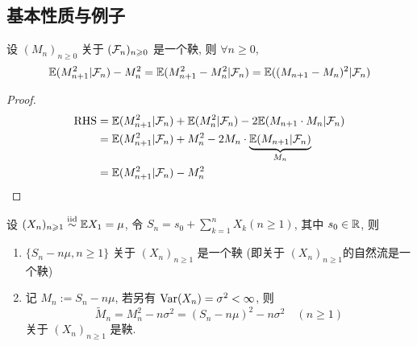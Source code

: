 \subsection{基本性质与例子}

\begin{property}\label{prt:p142-prt1}
设 $(M_n)_{n\geq 0}$ 关于 $(\mathcal{F}_n)_{n\geqslant 0}$ 是一个鞅, 则 $\forall n\geq 0$,
\[
\mathbb E(M_{n+1}^2|\mathcal{F}_n)-M_n^2=\mathbb E(M_{n+1}^2-M_n^2|\mathcal{F}_n)=\mathbb E((M_{n+1}-M_n)^2|\mathcal{F}_n)
\]
\end{property}

\begin{proof}
    \[
    \begin{aligned}
        \operatorname{RHS} &= \mathbb E(M_{n+1}^2|\mathcal{F}_n)+\mathbb E(M_n^2|\mathcal{F}_n)-2\mathbb E(M_{n+1}\cdot M_n|\mathcal{F}_n)\\
        &=\mathbb E(M_{n+1}^2|\mathcal{F}_n)+M_n^2-2M_n\cdot \underbrace{\mathbb E(M_{n+1}|\mathcal{F}_n)}_{M_n}\\
        &=\mathbb E(M_{n+1}^2|\mathcal{F}_n)-M_n^2
    \end{aligned}
    \]
\end{proof}

\begin{example}
    设 $(X_n)_{n\geqslant 1}\overset{\text{iid}}{\sim}\mathbb E X_1=\mu$, 令 $S_n=s_0+\sum_{k=1}^n X_k(n\geq 1)$, 其中 $s_0\in \mathbb{R}$, 则
    \begin{enumerate}
        \item $\{S_n-n\mu,n\geq 1\}$ 关于 $(X_n)_{n\geq 1}$ 是一个鞅 (即关于 $(X_n)_{n\geq 1}$的自然流是一个鞅)
        \item 记 $M_n:=S_n-n\mu$, 若另有 $\operatorname{Var}(X_n)=\sigma^2<\infty$, 则
        \[
        \tilde{M}_n=M_n^2-n\sigma^2=(S_n-n\mu)^2-n\sigma^2\quad (n\geq 1)
        \]
        关于 $(X_n)_{n\geq 1}$ 是鞅.
    \end{enumerate}
\end{example}

